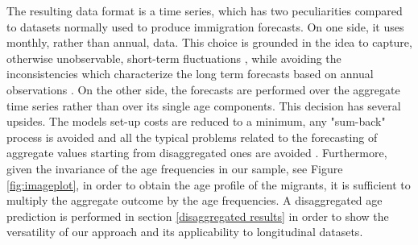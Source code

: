 \documentclass{article}\usepackage[]{graphicx}\usepackage[]{color}
\begin{document}
The resulting data format is a time series, which has two peculiarities compared to datasets normally used to produce immigration forecasts. On one side, it uses monthly, rather than annual, data. This choice is grounded in the idea to capture, otherwise unobservable, short-term fluctuations , while avoiding the inconsistencies which characterize the long term forecasts based on annual observations . On the other side, the forecasts are performed over the aggregate time series rather than over its single age components. This decision has several upsides. The models set-up costs are reduced to a minimum, any "sum-back" process is avoided and all the typical problems related to the forecasting of aggregate values starting from disaggregated ones are avoided . Furthermore, given the invariance of the age frequencies in our sample, see Figure \ref{fig:imageplot}, in order to obtain the age profile of the migrants, it is sufficient to multiply the aggregate outcome by the age frequencies. A disaggregated age prediction is performed in section \ref{disaggregated results} in order to show the versatility of our approach and its applicability to longitudinal datasets. 
\end{document}
